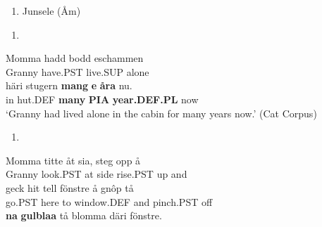 \begin{enumerate} %
\item 
Junsele (Åm)

\end{enumerate} %
\setcounter{listLFOxcviiileveli}{0}
\begin{enumerate} %
\item 
\end{enumerate} %
\ea\label{}
\gll Momma  hadd  bodd  eschammen\\


Granny  have.PST  live.SUP  alone\\ %


\ea\label{}
\gll häri  stugern  \textbf{mang}\textbf{  e}\textbf{  åra} nu.\\


in  hut.DEF  \textbf{many} \textbf{PIA} \textbf{year.DEF.PL} now\\ %


‘Granny had lived alone in the cabin for many years now.’ (Cat Corpus)
\z


\begin{enumerate} %
\item 
\end{enumerate} %
\ea\label{}
\gll Momma  titte  åt  sia,   steg  opp  å\\


Granny  look.PST  at  side  rise.PST  up  and\\ %


\ea\label{}
\gll geck  hit  tell  fönstre  å  gnôp  tå\\


go.PST  here  to  window.DEF  and  pinch.PST  off\\ %


\ea\label{}
\gll \textbf{na}\textbf{  gulblaa} tå  blomma  däri  fönstre.\\


